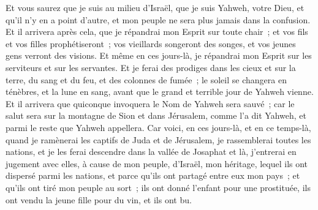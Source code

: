 \begin{multicols}{2}
Et vous saurez que je suis au milieu d'Israël, que je suis Yahweh, votre Dieu, et qu'il n'y en a point d'autre, et mon peuple ne sera plus jamais dans la confusion.
Et il arrivera après cela, que je répandrai mon Esprit sur toute chair~; et vos fils et vos filles prophétiseront~; vos vieillards songeront des songes, et vos jeunes gens verront des visions.
Et même en ces jours-là, je répandrai mon Esprit sur les serviteurs et sur les servantes.
Et je ferai des prodiges dans les cieux et sur la terre, du sang et du feu, et des colonnes de fumée~;
le soleil se changera en ténèbres, et la lune en sang, avant que le grand et terrible jour de Yahweh vienne.
Et il arrivera que quiconque invoquera le Nom de Yahweh sera sauvé~; car le salut sera sur la montagne de Sion et dans Jérusalem, comme l'a dit Yahweh, et parmi le reste que Yahweh appellera.
\VerseOne{}Car voici, en ces jours-là, et en ce temps-là, quand je ramènerai les captifs de Juda et de Jérusalem,
je rassemblerai toutes les nations, et je les ferai descendre dans la vallée de Josaphat et là, j'entrerai en jugement avec elles, à cause de mon peuple, d'Israël, mon héritage, lequel ils ont dispersé parmi les nations, et parce qu'ils ont partagé entre eux mon pays~;
et qu'ils ont tiré mon peuple au sort~; ils ont donné l'enfant pour une prostituée, ils ont vendu la jeune fille pour du vin, et ils ont bu.

\end{multicols}
